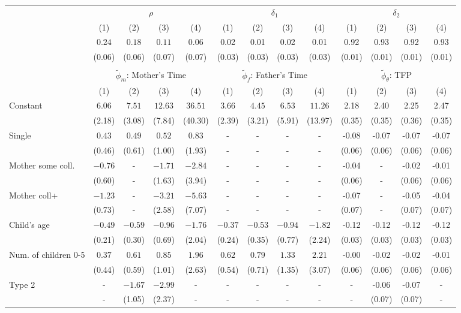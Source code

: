 \begin{tabular}{lcccccccccccc}\\\toprule
 & \multicolumn{4}{c}{$\rho$} & \multicolumn{4}{c}{$\delta_{1}$} & \multicolumn{4}{c}{$\delta_{2}$} \\
&(1)&(2)&(3)&(4)&(1)&(2)&(3)&(4)&(1)&(2)&(3)&(4)\\\cmidrule(r){2-5}\cmidrule(r){6-9}\cmidrule(r){10-13}
&$0.24$&$0.18$&$0.11$&$0.06$&0.02&0.01&0.02&0.01&0.92&0.93&0.92&0.93\\
&(0.06)&(0.06)&(0.07)&(0.07)&(0.03)&(0.03)&(0.03)&(0.03)&(0.01)&(0.01)&(0.01)&(0.01)\\
&&&&&&&&&&&&\\
 & \multicolumn{4}{c}{$\tilde{\phi}_{m}$: Mother's Time} & \multicolumn{4}{c}{$\tilde{\phi}_{f}$: Father's Time} & \multicolumn{4}{c}{$\tilde{\phi}_{\theta}$: TFP} \\
&(1)&(2)&(3)&(4)&(1)&(2)&(3)&(4)&(1)&(2)&(3)&(4)\\\cmidrule(r){2-5}\cmidrule(r){6-9}\cmidrule(r){10-13}
Constant&$6.06$&$7.51$&$12.63$&$36.51$&$3.66$&$4.45$&$6.53$&$11.26$&2.18&2.40&2.25&2.47\\
&(2.18)&(3.08)&(7.84)&(40.30)&(2.39)&(3.21)&(5.91)&(13.97)&(0.35)&(0.35)&(0.36)&(0.35)\\
Single&$0.43$&$0.49$&$0.52$&$0.83$&-&-&-&-&-0.08&-0.07&-0.07&-0.07\\
&(0.46)&(0.61)&(1.00)&(1.93)&-&-&-&-&(0.06)&(0.06)&(0.06)&(0.06)\\
Mother some coll.&$-0.76$&-&$-1.71$&$-2.84$&-&-&-&-&-0.04&-&-0.02&-0.01\\
&(0.60)&-&(1.63)&(3.94)&-&-&-&-&(0.06)&-&(0.06)&(0.06)\\
Mother coll+&$-1.23$&-&$-3.21$&$-5.63$&-&-&-&-&-0.07&-&-0.05&-0.04\\
&(0.73)&-&(2.58)&(7.07)&-&-&-&-&(0.07)&-&(0.07)&(0.07)\\
Child's age&$-0.49$&$-0.59$&$-0.96$&$-1.76$&$-0.37$&$-0.53$&$-0.94$&$-1.82$&-0.12&-0.12&-0.12&-0.12\\
&(0.21)&(0.30)&(0.69)&(2.04)&(0.24)&(0.35)&(0.77)&(2.24)&(0.03)&(0.03)&(0.03)&(0.03)\\
Num. of children 0-5&$0.37$&$0.61$&$0.85$&$1.96$&$0.62$&$0.79$&$1.33$&$2.21$&-0.00&-0.02&-0.02&-0.01\\
&(0.44)&(0.59)&(1.01)&(2.63)&(0.54)&(0.71)&(1.35)&(3.07)&(0.06)&(0.06)&(0.06)&(0.06)\\
Type 2&-&$-1.67$&$-2.99$&-&-&-&-&-&-&-0.06&-0.07&-\\
&-&(1.05)&(2.37)&-&-&-&-&-&-&(0.07)&(0.07)&-\\

\end{tabular}
